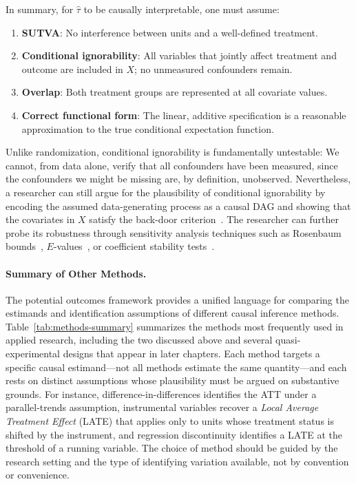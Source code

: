 In summary, for $\hat{\tau}$ to be causally interpretable, one must assume:
\begin{enumerate}[leftmargin=15pt]
    \item \textbf{SUTVA}: No interference between units and a well-defined treatment.
    \item \textbf{Conditional ignorability}: All variables that jointly affect treatment and outcome are included in $X$; no unmeasured confounders remain.
    \item \textbf{Overlap}: Both treatment groups are represented at all covariate values.
    \item \textbf{Correct functional form}: The linear, additive specification is a reasonable approximation to the true conditional expectation function.
\end{enumerate}
Unlike randomization, conditional ignorability is fundamentally untestable: We cannot, from data alone, verify that all confounders have been measured, since the confounders we might be missing are, by definition, unobserved.
Nevertheless, a researcher can still argue for the plausibility of conditional ignorability by encoding the assumed data-generating process as a causal DAG and showing that the covariates in $X$ satisfy the back-door criterion~\cite{pearl2009causality}.
The researcher can further probe its robustness through sensitivity analysis techniques such as Rosenbaum bounds~\cite{rosenbaum2002observational}, $E$-values~\cite{vanderweele2017sensitivity}, or coefficient stability tests~\cite{oster2019unobservable}.

\paragraph{Summary of Other Methods.}
The potential outcomes framework provides a unified language for comparing the estimands and identification assumptions of different causal inference methods.
Table~\ref{tab:methods-summary} summarizes the methods most frequently used in applied research, including the two discussed above and several quasi-experimental designs that appear in later chapters.
Each method targets a specific causal estimand---not all methods estimate the same quantity---and each rests on distinct assumptions whose plausibility must be argued on substantive grounds.
For instance, difference-in-differences identifies the ATT under a parallel-trends assumption, instrumental variables recover a \emph{Local Average Treatment Effect} (LATE) that applies only to units whose treatment status is shifted by the instrument, and regression discontinuity identifies a LATE at the threshold of a running variable.
The choice of method should be guided by the research setting and the type of identifying variation available, not by convention or convenience.

